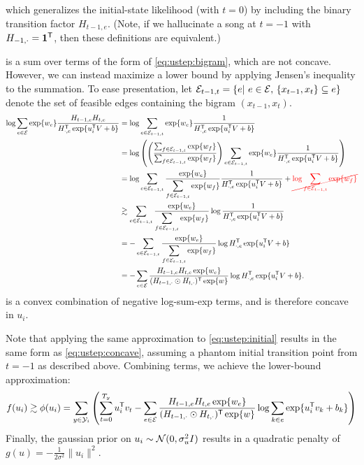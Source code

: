 \documentclass{article}
\newcommand{\ccancel}[2][black]{\color{#1}\cancel{#2}\normalcolor}
\def\E{\ensuremath{\mathcal{E}}}
\begin{document}
which generalizes the initial-state likelihood (with $t=0$) by including the binary transition factor $H_{t-1,e}$.  
(Note, if we hallucinate a song at $t=-1$ with $H_{-1,\cdot} = \mathbf{1}^\mathsf{T}$, then these definitions are equivalent.)

 is a sum over terms of the form of \cref{eq:ustep:bigram}, which are not concave.  However, we can instead maximize a lower bound by applying Jensen's inequality to
the summation.  To ease presentation, let ${\E_{t-1,t} = \{e \given e \in \E,\, \{x_{t-1}, x_{t}\} \subseteq e\}}$ denote the set of feasible edges containing the bigram $(x_{t-1}, x_t)$.
\begin{align}
\log\sum_{e\in \E} \exp\{w_e\} \frac{H_{t-1,e} H_{t, e} }{H_{\cdot,e}\trans \exp\{u_i\trans V + b \} }
&= \log\sum_{e \in \E_{t-1,t}} \exp\{w_e\} \frac{1}{H_{\cdot, e}\trans \exp\{u_i\trans V + b\} }\notag\\
&= \log\left( \left(\frac{\sum_{f \in \E_{t-1,t}} \exp\{w_f\}}{\sum_{f \in \E_{t-1,t}}
\exp\{w_f\}} \right) \sum_{e \in \E_{t-1,t}} \exp\{w_e\} \frac{1}{H_{\cdot, e}\trans
\exp\{u_i\trans V + b\} }\right)\notag\\
&= \log\sum_{e \in \E_{t-1,t}} \frac{\exp\{w_e\}}{\displaystyle\sum_{f\in\E_{t-1,t}} \exp\{w_f\}} \frac{1}{H_{\cdot, e}\trans \exp\{u_i\trans V + b\} } + \ccancel[red]{\log \sum_{f \in \E_{t-1,t}} \exp\{w_f\}}\notag\\
&\gtrsim \sum_{e \in \E_{t-1,t}}
\frac{\exp\{w_e\}}{\displaystyle\sum_{f\in\E_{t-1,t}}
\exp\{w_f\}} \log \frac{1}{H_{\cdot, e}\trans \exp\{u_i\trans
V + b\}}  \notag\\
&= -\sum_{e \in \E_{t-1,t}} \frac{\exp\{w_e\}}{\displaystyle\sum_{f\in\E_{t-1,t}} \exp\{w_f\}} \log H_{\cdot, e}\trans \exp\{u_i\trans V + b\}  \notag\\
&= -\sum_{e\in\E} \frac{H_{t-1,e} H_{t,e} \exp\{w_e\}}{ (H_{t-1,\cdot} \odot H_{t,\cdot})\trans \exp\{w\}} \log H_{\cdot, e}\trans \exp\{u_i\trans V + b\}  \label{eq:ustep:concave}.
\end{align}
 is a convex combination of negative log-sum-exp terms, and is therefore concave in $u_i$.  

Note that applying the same approximation to \cref{eq:ustep:initial} results in the same form as \cref{eq:ustep:concave}, assuming a phantom initial transition point from $t=-1$ 
as described above.  Combining terms, we achieve the lower-bound approximation:
\begin{equation}
f(u_i) \gtrsim \phi(u_i) = \sum_{y \in \Y_i} \left(\sum_{t=0}^{T_y} u_i\trans v_t - \sum_{e \in \E} \frac{H_{t-1,e} H_{t,e} \exp\{w_e\}}{ (H_{t-1,\cdot}\odot H_{t,\cdot})\trans \exp\{w\}} \log
\sum_{k\in e} \exp\{u_i\trans v_k + b_k\} \right)\label{eq:ustep:concave_obj}
\end{equation}
Finally, the gaussian prior on $u_i \sim \mathcal{N}(0, \sigma_u^2 I)$ results in a quadratic penalty of $g(u) = -\frac{1}{2\sigma^2}\|u_i\|^2$.
\end{document}
